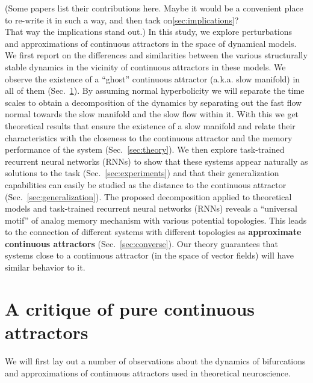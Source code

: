 \documentclass{article} %
\newcommand{\pscomment}[1]{\textcolor{BurntOrange}{(#1)}}
\newcounter{ct}
\theoremstyle{definition}
\theoremstyle{remark}
\begin{document}
\pscomment{Some papers list their contributions here. Maybe it would be a convenient place to re-write it in such a way, and then tack on\ref{sec:implications}?\\
That way the implications stand out.}
In this study, we explore perturbations and approximations of continuous attractors in the space of dynamical models.
We first report on the differences and similarities between the various structurally stable dynamics in the vicinity of continuous attractors in these models.
We observe the existence of a ``ghost'' continuous attractor (a.k.a. slow manifold) in all of them (Sec.~\ref{sec:critique}).
By assuming normal hyperbolicity we will separate the time scales to obtain a decomposition of the dynamics by separating out the fast flow normal towards the slow manifold and the slow flow within it.
With this we get theoretical results that ensure the existence of a slow manifold and relate their characteristics with the closeness to the continuous attractor and the memory performance of the system (Sec.~\ref{sec:theory}).
We then explore task-trained recurrent neural networks (RNNs) to show that these systems appear naturally as solutions to the task (Sec.~\ref{sec:experiments}) and that their generalization capabilities can easily be studied as the distance to the continuous attractor (Sec.~\ref{sec:generalization}).
The proposed decomposition applied to theoretical models and task-trained recurrent neural networks (RNNs) reveals a ``universal motif'' of analog memory mechanism with various potential topologies.
This leads to the connection of different systems with different topologies as \textbf{approximate continuous attractors} (Sec.~\ref{sec:converse}).
Our theory guarantees that systems close to a continuous attractor (in the space of vector fields) will have similar behavior to it.


\section{A critique of pure continuous attractors}\label{sec:critique}
We will first lay out a number of observations about the dynamics of bifurcations and approximations of continuous attractors used in theoretical neuroscience.
\end{document}
